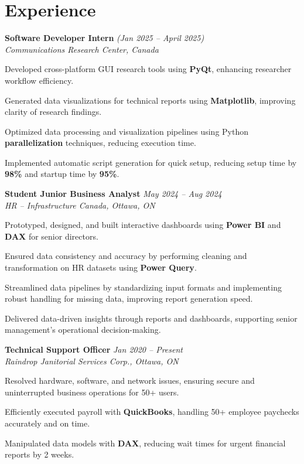 \documentclass[11pt]{article}
\begin{document}
\section*{Experience}
\begin{small}
\noindent\textbf{Software Developer Intern} \hfill \textit{(Jan 2025 -- April 2025)} \\
\textit{Communications Research Center, Canada}
\begin{compactitem}
    \item Developed cross-platform GUI research tools using \textbf{PyQt}, enhancing researcher workflow efficiency.
    \item Generated data visualizations for technical reports using \textbf{Matplotlib}, improving clarity of research findings.
    \item Optimized data processing and visualization pipelines using Python \textbf{parallelization} techniques, reducing execution time.
    \item Implemented automatic script generation for quick setup, reducing setup time by \textbf{98\%} and startup time by \textbf{95\%}.
\end{compactitem}

\noindent\textbf{Student Junior Business Analyst} \hfill \textit{May 2024 -- Aug 2024} \\
\textit{HR -- Infrastructure Canada, Ottawa, ON}
\begin{compactitem}
    \item Prototyped, designed, and built interactive dashboards using \textbf{Power BI} and \textbf{DAX} for senior directors.
    \item Ensured data consistency and accuracy by performing cleaning and transformation on HR datasets using \textbf{Power Query}.
    \item Streamlined data pipelines by standardizing input formats and implementing robust handling for missing data, improving report generation speed.
    \item Delivered data-driven insights through reports and dashboards, supporting senior management's operational decision-making.
\end{compactitem}

\noindent\textbf{Technical Support Officer} \hfill \textit{Jan 2020 -- Present} \\
\textit{Raindrop Janitorial Services Corp., Ottawa, ON}
\begin{compactitem}
    \item Resolved hardware, software, and network issues, ensuring secure and uninterrupted business operations for 50+ users.
    \item Efficiently executed payroll with \textbf{QuickBooks}, handling 50+ employee paychecks accurately and on time.
    \item Manipulated data models with \textbf{DAX}, reducing wait times for urgent financial reports by 2 weeks.
\end{compactitem}
\end{small}
\end{document}
